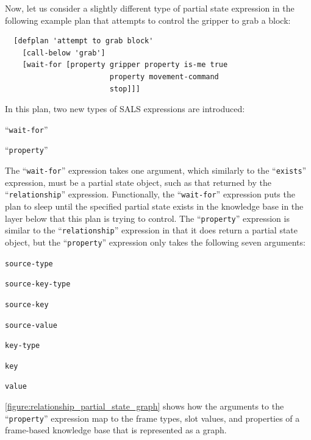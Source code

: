 Now, let us consider a slightly different type of partial state
expression in the following example plan that attempts to control the
gripper to grab a block:
\begin{samepage}
\begin{Verbatim}
  [defplan 'attempt to grab block'
    [call-below 'grab']
    [wait-for [property gripper property is-me true
                        property movement-command
                        stop]]]
\end{Verbatim}
\end{samepage}
In this plan, two new types of SALS expressions are introduced:
\begin{packed_itemize}
\item{``{\tt{wait-for}}''}
\item{``{\tt{property}}''}
\end{packed_itemize}
The ``{\tt{wait-for}}'' expression takes one argument, which similarly
to the ``{\tt{exists}}'' expression, must be a partial state object,
such as that returned by the ``{\tt{relationship}}'' expression.
Functionally, the ``{\tt{wait-for}}'' expression puts the plan to
sleep until the specified partial state exists in the knowledge base
in the layer below that this plan is trying to control.  The
``{\tt{property}}'' expression is similar to the
``{\tt{relationship}}'' expression in that it does return a partial
state object, but the ``{\tt{property}}'' expression only takes the
following seven arguments:
\begin{packed_enumerate}
\item{{\tt{source-type}}}
\item{{\tt{source-key-type}}}
\item{{\tt{source-key}}}
\item{{\tt{source-value}}}
\item{{\tt{key-type}}}
\item{{\tt{key}}}
\item{{\tt{value}}}
\end{packed_enumerate}
{\mbox{\autoref{figure:relationship_partial_state_graph}}} shows how
the arguments to the ``{\tt{property}}'' expression map to the frame
types, slot values, and properties of a frame-based knowledge base
that is represented as a graph.
